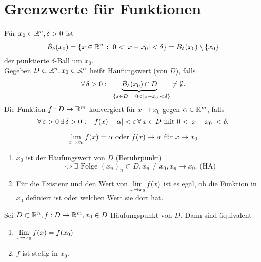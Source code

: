 \documentclass[../ana1.tex]{subfiles}
\begin{document}
\setcounter{section}{15}
\section{Grenzwerte für Funktionen}
\begin{defi}
    Für \( x_0 \in \mathbb{R}^n, \delta > 0 \) ist
    \[ \dot{B}_\delta(x_0) = \{ x \in \mathbb{R}^n \;\colon \; 
    0 < \left|x-x_0\right| < \delta \} = B_\delta (x_0) \setminus 
    \{x_0\} \]
    der punktierte \( \delta \)-Ball um \( x_0 \).\\
    Gegeben \( D \subset \mathbb{R}^n, x_0 \in \mathbb{R}^n \) heißt 
    Häufungswert (von \( D \)), falls 
    \[ \forall \, \delta > 0 : \underbrace{ 
    \dot{B}_\delta(x_0) \cap D}_{ = \{ x\in D \;\colon \;
    0 < \left| x - x_0 \right| < \delta \} } \neq \emptyset. \]
    Die Funktion \( f: D\rightarrow \mathbb{R}^m \) konvergiert für 
    \( x\rightarrow x_0 \) gegen \( \alpha \in \mathbb{R}^m \), falls
    \[ \forall \,\varepsilon > 0 \,\exists \, \delta > 0 
    \;\colon \; \left| f(x) - \alpha \right| < \varepsilon \,\forall \, 
    x \in D\text{ mit } 0 < \left|x-x_0\right| < \delta. \]
\end{defi}
\begin{notation}
    \[ \lim\limits_{x\rightarrow x_0} f(x) = \alpha \text{ oder } f(x) 
    \rightarrow \alpha \text{ für } x\rightarrow x_0 \]
\end{notation}
\begin{bem}\leavevmode
    \begin{enumerate}
        \item \( x_0 \) ist der Häufungswert von \( D \) (Berührpunkt)
        \[ \Leftrightarrow \exists \text{ Folge } {(x_n)}_n \subset D, 
        x_n \neq x_0, x_n \rightarrow x_0. \text{ (HA)} \]
        \item Für die Existenz und den Wert von \( \lim\limits_{x\rightarrow x_0} f(x) \)
        ist es egal, ob die Funktion in \( x_0 \) definiert ist oder welchen 
        Wert sie dort hat.

    \end{enumerate}
\end{bem}
\begin{lem}
    Sei \( D \subset \mathbb{R}^n, f : D \rightarrow \mathbb{R}^m, x_0 \in D \) 
    Häufungspunkt von \(D\). Dann sind äquivalent
    \begin{enumerate}
        \item \( \lim\limits_{x\rightarrow x_0} f(x) = f(x_0) \)
        \item \( f \) ist stetig in \( x_0 \).
    \end{enumerate}
\end{lem}
\end{document}
